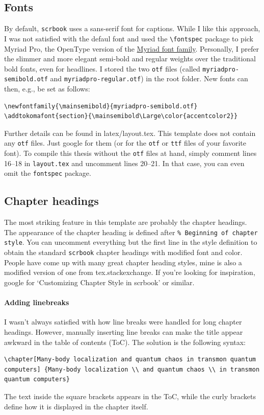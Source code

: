 \subsection{Fonts}
By default, \verb|scrbook| uses a sans-serif font for captions. While I like this approach, I was not satisfied with the defaul font and used the \verb|\fontspec| package to pick Myriad Pro, the OpenType version of the \href{https://en.wikipedia.org/wiki/Myriad_(typeface)}{Myriad font family}.
Personally, I prefer the slimmer and more elegant semi-bold and regular weights over the traditional bold fonts, even for headlines. I stored the two \verb|otf| files (called \verb|myriadpro-semibold.otf| and \verb|myriadpro-regular.otf|) in the root folder. New fonts can then, e.g., be set as follows:
\begin{lstlisting}
\newfontfamily{\mainsemibold}{myriadpro-semibold.otf}
\addtokomafont{section}{\mainsemibold\Large\color{accentcolor2}}
\end{lstlisting}
Further details can be found in latex/layout.tex. This template does not contain any \verb|otf| files. Just google for them (or for the \verb|otf| or \verb|ttf| files of your favorite font).
To compile this thesis without the \verb|otf| files at hand, simply comment lines 16--18 in \verb|layout.tex| and uncomment lines 20--21. In that case, you can even omit the \verb|fontspec| package.


\subsection{Chapter headings}
The most striking feature in this template are probably the chapter headings.
The appearance of the chapter heading is defined after \verb|% Beginning of chapter style|. You can uncomment everything but the first line in the style definition to obtain the standard \verb|scrbook| chapter headings with modified font and color. People have come up with many great chapter heading styles, mine is also a modified version of one from tex.stackexchange. If you’re looking for inspiration, google for `Customizing Chapter Style in scrbook' or similar.

\paragraph{Adding linebreaks}
I wasn't always satisfied with how line breaks were handled for long chapter headings. However, manually inserting line breaks can make the title appear awkward in the table of contents (ToC). The solution is the following syntax:
\begin{lstlisting}
\chapter[Many-body localization and quantum chaos in transmon quantum computers] {Many-body localization \\ and quantum chaos \\ in transmon quantum computers}
\end{lstlisting}
The text inside the square brackets appears in the ToC, while the curly brackets define how it is displayed in the chapter itself.

